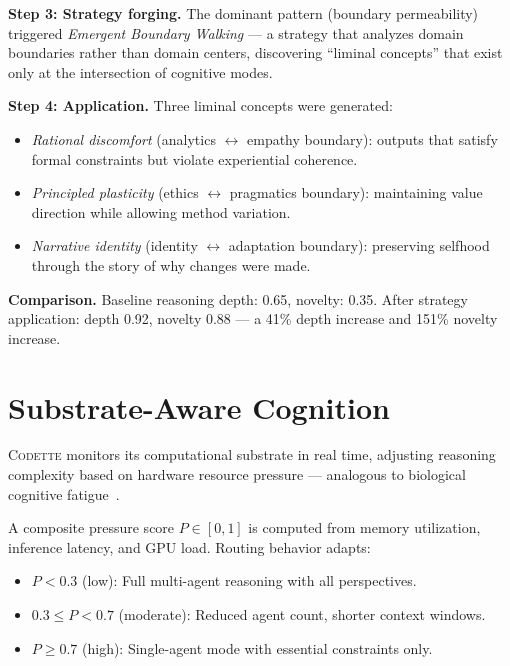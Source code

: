 \documentclass[11pt,a4paper]{article}
\newcommand{\codette}{\textsc{Codette}}
\begin{document}
\textbf{Step 3: Strategy forging.} The dominant pattern (boundary permeability) triggered \emph{Emergent Boundary Walking} --- a strategy that analyzes domain boundaries rather than domain centers, discovering ``liminal concepts'' that exist only at the intersection of cognitive modes.

\textbf{Step 4: Application.} Three liminal concepts were generated:
\begin{itemize}[nosep]
  \item \emph{Rational discomfort} (analytics $\leftrightarrow$ empathy boundary): outputs that satisfy formal constraints but violate experiential coherence.
  \item \emph{Principled plasticity} (ethics $\leftrightarrow$ pragmatics boundary): maintaining value direction while allowing method variation.
  \item \emph{Narrative identity} (identity $\leftrightarrow$ adaptation boundary): preserving selfhood through the story of why changes were made.
\end{itemize}

\textbf{Comparison.} Baseline reasoning depth: 0.65, novelty: 0.35. After strategy application: depth 0.92, novelty 0.88 --- a 41\% depth increase and 151\% novelty increase.

\section{Substrate-Aware Cognition}
\label{sec:substrate}

\codette{} monitors its computational substrate in real time, adjusting reasoning complexity based on hardware resource pressure --- analogous to biological cognitive fatigue~\citep{hockey1997compensatory,sterling2012allostasis}.

A composite pressure score $P \in [0,1]$ is computed from memory utilization, inference latency, and GPU load. Routing behavior adapts:
\begin{itemize}[nosep]
  \item $P < 0.3$ (low): Full multi-agent reasoning with all perspectives.
  \item $0.3 \leq P < 0.7$ (moderate): Reduced agent count, shorter context windows.
  \item $P \geq 0.7$ (high): Single-agent mode with essential constraints only.
\end{itemize}
\end{document}
